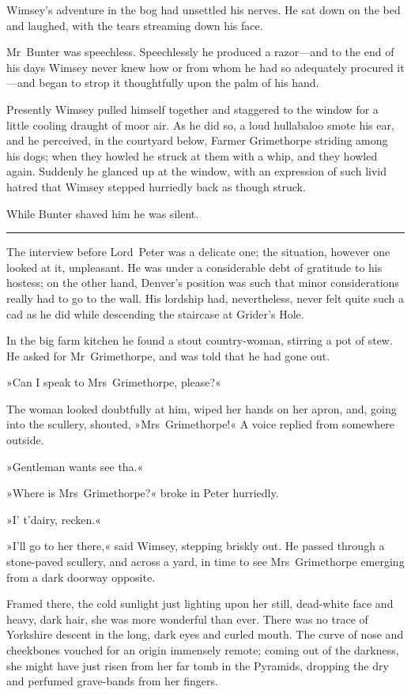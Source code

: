 Wimsey's adventure in the bog had unsettled his nerves. He sat down on the bed and laughed, with the tears streaming down his face.

Mr~Bunter was speechless. Speechlessly he produced a razor—and to the end of his days Wimsey never knew how or from whom he had so adequately procured it—and began to strop it thoughtfully upon the palm of his hand.

Presently Wimsey pulled himself together and staggered to the window for a little cooling draught of moor air. As he did so, a loud hullabaloo smote his ear, and he perceived, in the courtyard below, Farmer Grimethorpe striding among his dogs; when they howled he struck at them with a whip, and they howled again. Suddenly he glanced up at the window, with an expression of such livid hatred that Wimsey stepped hurriedly back as though struck.

While Bunter shaved him he was silent. 

\noindent\hfil\rule{0.5\textwidth}{.4pt}\hfil 

The interview before Lord~Peter was a delicate one; the situation, however one looked at it, unpleasant. He was under a considerable debt of gratitude to his hostess; on the other hand, Denver's position was such that minor considerations really had to go to the wall. His lordship had, nevertheless, never felt quite such a cad as he did while descending the staircase at Grider's Hole.

In the big farm kitchen he found a stout country-woman, stirring a pot of stew. He asked for Mr~Grimethorpe, and was told that he had gone out.

»Can I speak to Mrs~Grimethorpe, please?«

The woman looked doubtfully at him, wiped her hands on her apron, and, going into the scullery, shouted, »Mrs~Grimethorpe!« A voice replied from somewhere outside.

»Gentleman wants see tha.«

»Where is Mrs~Grimethorpe?« broke in Peter hurriedly.

»I' t'dairy, recken.«

»I'll go to her there,« said Wimsey, stepping briskly out. He passed through a stone-paved scullery, and across a yard, in time to see Mrs~Grimethorpe emerging from a dark doorway opposite.

Framed there, the cold sunlight just lighting upon her still, dead-white face and heavy, dark hair, she was more wonderful than ever.  There was no trace of Yorkshire descent in the long, dark eyes and curled mouth. The curve of nose and cheekbones vouched for an origin immensely remote; coming out of the darkness, she might have just risen from her far tomb in the Pyramids, dropping the dry and perfumed grave-bands from her fingers.

